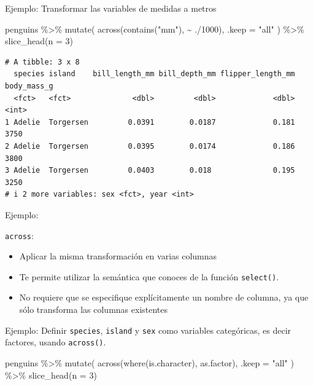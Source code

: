 \documentclass[
  letterpaper,
  DIV=11,
  numbers=noendperiod]{scrreprt}
\newenvironment{Shaded}{\begin{snugshade}}{\end{snugshade}}
\newcommand{\AttributeTok}[1]{\textcolor[rgb]{0.40,0.45,0.13}{#1}}
\newcommand{\DecValTok}[1]{\textcolor[rgb]{0.68,0.00,0.00}{#1}}
\newcommand{\FunctionTok}[1]{\textcolor[rgb]{0.28,0.35,0.67}{#1}}
\newcommand{\NormalTok}[1]{\textcolor[rgb]{0.00,0.23,0.31}{#1}}
\newcommand{\SpecialCharTok}[1]{\textcolor[rgb]{0.37,0.37,0.37}{#1}}
\newcommand{\StringTok}[1]{\textcolor[rgb]{0.13,0.47,0.30}{#1}}
\begin{document}
{Ejemplo}: Transformar las variables de medidas a metros

\begin{Shaded}
\begin{Highlighting}[]
\NormalTok{penguins }\SpecialCharTok{\%\textgreater{}\%} 
  \FunctionTok{mutate}\NormalTok{(}
    \FunctionTok{across}\NormalTok{(}\FunctionTok{contains}\NormalTok{(}\StringTok{"mm"}\NormalTok{), }\SpecialCharTok{\textasciitilde{}}\NormalTok{ .}\SpecialCharTok{/}\DecValTok{1000}\NormalTok{),}
    \AttributeTok{.keep =} \StringTok{"all"}
\NormalTok{  ) }\SpecialCharTok{\%\textgreater{}\%} 
  \FunctionTok{slice\_head}\NormalTok{(}\AttributeTok{n =} \DecValTok{3}\NormalTok{)}
\end{Highlighting}
\end{Shaded}

\begin{verbatim}
# A tibble: 3 x 8
  species island    bill_length_mm bill_depth_mm flipper_length_mm body_mass_g
  <fct>   <fct>              <dbl>         <dbl>             <dbl>       <int>
1 Adelie  Torgersen         0.0391        0.0187             0.181        3750
2 Adelie  Torgersen         0.0395        0.0174             0.186        3800
3 Adelie  Torgersen         0.0403        0.018              0.195        3250
# i 2 more variables: sex <fct>, year <int>
\end{verbatim}

{Ejemplo}:

\texttt{across}:

\begin{itemize}
\item
  Aplicar la misma transformación en varias columnas
\item
  Te permite utilizar la semántica que conoces de la función
  \texttt{select()}.
\item
  No requiere que se especifique explícitamente un nombre de columna, ya
  que sólo transforma las columnas existentes
\end{itemize}

{Ejemplo}: Definir \texttt{species}, \texttt{island} y \texttt{sex} como
variables categóricas, es decir factores, usando \texttt{across()}.

\begin{Shaded}
\begin{Highlighting}[]
\NormalTok{penguins }\SpecialCharTok{\%\textgreater{}\%} 
  \FunctionTok{mutate}\NormalTok{(}
    \FunctionTok{across}\NormalTok{(}\FunctionTok{where}\NormalTok{(is.character), as.factor),}
    \AttributeTok{.keep =} \StringTok{"all"}
\NormalTok{  ) }\SpecialCharTok{\%\textgreater{}\%} 
  \FunctionTok{slice\_head}\NormalTok{(}\AttributeTok{n =} \DecValTok{3}\NormalTok{)}
\end{Highlighting}
\end{Shaded}
\end{document}
